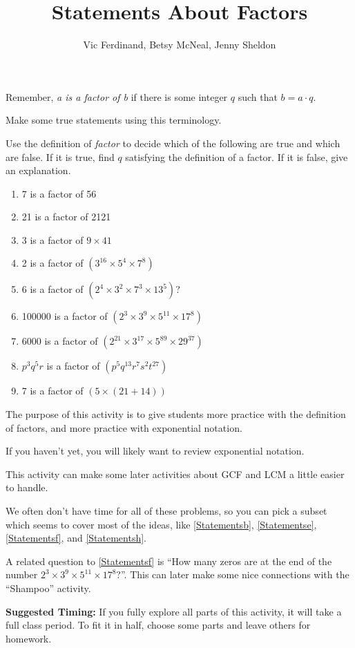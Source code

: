 \documentclass{ximera}
\title{Statements About Factors}
\author{Vic Ferdinand, Betsy McNeal, Jenny Sheldon}
\begin{document}
\begin{abstract} \end{abstract}
\maketitle




Remember, \emph{a is a factor of b} if there is some integer $q$ such that $b = a \cdot q$.
\begin{problem}
 Make some true statements using this terminology.
\end{problem}

\begin{problem}
Use the definition of \emph{factor} to decide which of the following are true and which are false. If it is true, find $q$ satisfying the definition of a factor. If it is false, give an explanation.

\begin{enumerate}
\item 7 is a factor of 56 
\item \label{Statementsb} 21 is a factor of 2121
\item \label{Statementsc} 3 is a factor of $9 \times 41$
\item \label{Statementsd} 2 is a factor of $(3^{16} \times 5^4 \times 7^8)$
\item \label{Statementse} 6 is a factor of $(2^4 \times 3^2 \times 7^3 \times 13^5)$?
\item \label{Statementsf} 100000 is a factor of  $(2^3 \times 3^9 \times 5^{11} \times17^8)$
\item \label{Statementsg} 6000  is a factor of  $(2^{21} \times 3^{17} \times 5^{89} \times 29^{37})$
\item \label{Statementsh} $p^3q^5r$  is a factor of $(p^5q^{13}r^7s^2t^{27}) $
\item \label{Statementsi} 7 is a factor of $(5 \times (21+14))$
\end{enumerate}
\end{problem}


\newpage
\begin{instructorNotes}
The purpose of this activity is to give students more practice with the definition of factors, and more practice with exponential notation.

If you haven't yet, you will likely want to review exponential notation.

This activity can make some later activities about GCF and LCM a little easier to handle.

We often don't have time for all of these problems, so you can pick a subset which seems to cover most of the ideas, like \ref{Statementsb}, \ref{Statementse}, \ref{Statementsf}, and \ref{Statementsh}.

A related question to \ref{Statementsf} is ``How many zeros are at the end of the number $2^3\times 3^9\times 5^{11} \times 17^8$?''.  This can later make some nice connections with the ``Shampoo'' activity.

{\bf Suggested Timing:} If you fully explore all parts of this activity, it will take a full class period.  To fit it in half, choose some parts and leave others for homework.
\end{instructorNotes}
\end{document}
